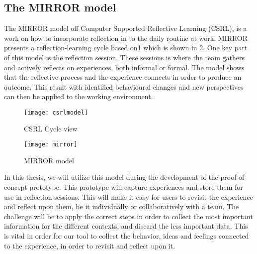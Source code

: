 \subsection{The MIRROR model}
\label{mirrorsection}
The MIRROR model off Computer Supported Reflective Learning (CSRL), is a work on how to incorporate reflection in to the daily routine at work.
MIRROR presents a reflection-learning cycle based on\ref{csrlmodel} which is shown in \ref{mirrormodel}. One key part of this model is the reflection session. These sessions is where the team gathers and actively reflects on experiences, both informal or formal. The model shows that the reflective process and the experience connects in order to produce an outcome. This result with identified behavioural changes and new perspectives can then be applied to the working environment. 
\begin{figure}[!htpb]
\label{csrlmodel}
\centering
	\texttt{[image: csrlmodel]}
\caption{CSRL Cycle view}
\end{figure}

\begin{figure}[!htpb]
\centering
	\texttt{[image: mirror]}
\caption{MIRROR model}
\label{mirrormodel}
\end{figure}


In this thesis, we will utilize this model during the development of the proof-of-concept prototype. This prototype will capture experiences and store them for use in reflection sessions. This will make it easy for users to revisit the experience and reflect upon them, be it individually or collaboratively with a team. The challenge will be to apply the correct steps in order to collect the most important information for the different contexts, and discard the less important data. This is vital in order for our tool to collect the behavior, ideas and feelings connected to the experience, in order to revisit and reflect upon it. 
\clearpage




